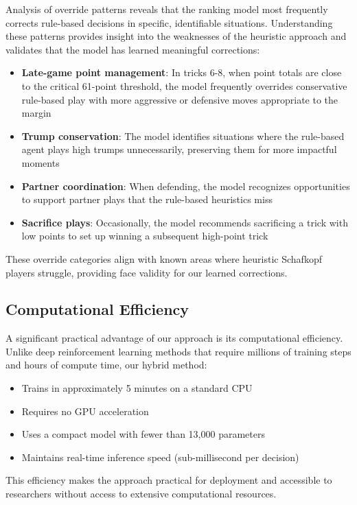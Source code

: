 \documentclass[conference]{IEEEtran}
\begin{document}
Analysis of override patterns reveals that the ranking model most frequently corrects rule-based decisions in specific, identifiable situations. Understanding these patterns provides insight into the weaknesses of the heuristic approach and validates that the model has learned meaningful corrections:

\begin{itemize}
    \item \textbf{Late-game point management}: In tricks 6-8, when point totals are close to the critical 61-point threshold, the model frequently overrides conservative rule-based play with more aggressive or defensive moves appropriate to the margin
    \item \textbf{Trump conservation}: The model identifies situations where the rule-based agent plays high trumps unnecessarily, preserving them for more impactful moments
    \item \textbf{Partner coordination}: When defending, the model recognizes opportunities to support partner plays that the rule-based heuristics miss
    \item \textbf{Sacrifice plays}: Occasionally, the model recommends sacrificing a trick with low points to set up winning a subsequent high-point trick
\end{itemize}

These override categories align with known areas where heuristic Schafkopf players struggle, providing face validity for our learned corrections.

\subsection{Computational Efficiency}

A significant practical advantage of our approach is its computational efficiency. Unlike deep reinforcement learning methods that require millions of training steps and hours of compute time, our hybrid method:
\begin{itemize}
    \item Trains in approximately 5 minutes on a standard CPU
    \item Requires no GPU acceleration
    \item Uses a compact model with fewer than 13,000 parameters
    \item Maintains real-time inference speed (sub-millisecond per decision)
\end{itemize}

This efficiency makes the approach practical for deployment and accessible to researchers without access to extensive computational resources.
\end{document}
